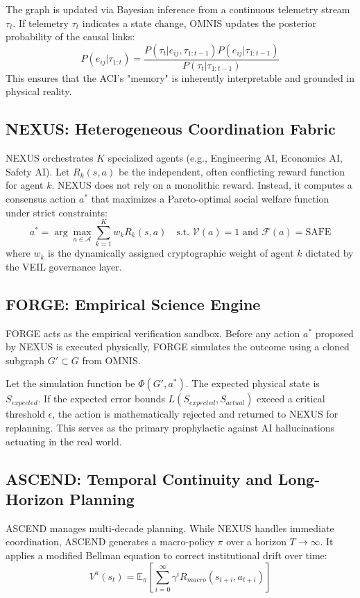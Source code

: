 \documentclass[12pt,a4paper]{article}
\begin{document}
The graph is updated via Bayesian inference from a continuous telemetry stream $\tau_t$. If telemetry $\tau_t$ indicates a state change, OMNIS updates the posterior probability of the causal links:
\begin{equation}
    P(e_{ij} | \tau_{1:t}) = \frac{P(\tau_t | e_{ij}, \tau_{1:t-1}) P(e_{ij} | \tau_{1:t-1})}{P(\tau_t | \tau_{1:t-1})}
\end{equation}
This ensures that the ACI's "memory" is inherently interpretable and grounded in physical reality.

\subsection{NEXUS: Heterogeneous Coordination Fabric}
NEXUS orchestrates $K$ specialized agents (e.g., Engineering AI, Economics AI, Safety AI). Let $R_k(s,a)$ be the independent, often conflicting reward function for agent $k$. NEXUS does not rely on a monolithic reward. Instead, it computes a consensus action $a^*$ that maximizes a Pareto-optimal social welfare function under strict constraints:
\begin{equation}
    a^* = \arg\max_{a \in \mathcal{A}} \sum_{k=1}^K w_k R_k(s,a) \quad \text{s.t. } \mathcal{V}(a) = 1 \text{ and } \mathcal{F}(a) = \text{SAFE}
\end{equation}
where $w_k$ is the dynamically assigned cryptographic weight of agent $k$ dictated by the VEIL governance layer.

\subsection{FORGE: Empirical Science Engine}
FORGE acts as the empirical verification sandbox. Before any action $a^*$ proposed by NEXUS is executed physically, FORGE simulates the outcome using a cloned subgraph $G' \subset G$ from OMNIS. 

Let the simulation function be $\Phi(G', a^*)$. The expected physical state is $S_{expected}$. If the expected error bounds $L(S_{expected}, S_{actual})$ exceed a critical threshold $\epsilon$, the action is mathematically rejected and returned to NEXUS for replanning. This serves as the primary prophylactic against AI hallucinations actuating in the real world.

\subsection{ASCEND: Temporal Continuity and Long-Horizon Planning}
ASCEND manages multi-decade planning. While NEXUS handles immediate coordination, ASCEND generates a macro-policy $\pi$ over a horizon $T \to \infty$. It applies a modified Bellman equation to correct institutional drift over time:
\begin{equation}
    V^{\pi}(s_t) = \mathbb{E}_{\pi} \left[ \sum_{i=0}^{\infty} \gamma^i R_{macro}(s_{t+i}, a_{t+i}) \right]
\end{equation}
\end{document}
